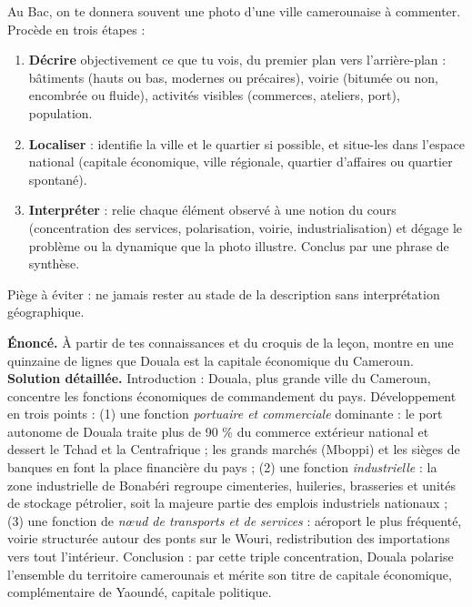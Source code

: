 \documentclass[11pt]{article}
\begin{document}
\begin{methode}
Au Bac, on te donnera souvent une photo d'une ville camerounaise à commenter. Procède en trois étapes :
\begin{enumerate}
\item \textbf{Décrire} objectivement ce que tu vois, du premier plan vers l'arrière-plan : bâtiments (hauts ou bas, modernes ou précaires), voirie (bitumée ou non, encombrée ou fluide), activités visibles (commerces, ateliers, port), population.
\item \textbf{Localiser} : identifie la ville et le quartier si possible, et situe-les dans l'espace national (capitale économique, ville régionale, quartier d'affaires ou quartier spontané).
\item \textbf{Interpréter} : relie chaque élément observé à une notion du cours (concentration des services, polarisation, voirie, industrialisation) et dégage le problème ou la dynamique que la photo illustre. Conclus par une phrase de synthèse.
\end{enumerate}
Piège à éviter : ne jamais rester au stade de la description sans interprétation géographique.
\end{methode}

\begin{exoresolu}
\textbf{Énoncé.} À partir de tes connaissances et du croquis de la leçon, montre en une quinzaine de lignes que Douala est la capitale économique du Cameroun.
\tcblower
\textbf{Solution détaillée.} Introduction : Douala, plus grande ville du Cameroun, concentre les fonctions économiques de commandement du pays. Développement en trois points : (1) une fonction \emph{portuaire et commerciale} dominante : le port autonome de Douala traite plus de 90 \% du commerce extérieur national et dessert le Tchad et la Centrafrique ; les grands marchés (Mboppi) et les sièges de banques en font la place financière du pays ; (2) une fonction \emph{industrielle} : la zone industrielle de Bonabéri regroupe cimenteries, huileries, brasseries et unités de stockage pétrolier, soit la majeure partie des emplois industriels nationaux ; (3) une fonction de \emph{nœud de transports et de services} : aéroport le plus fréquenté, voirie structurée autour des ponts sur le Wouri, redistribution des importations vers tout l'intérieur. Conclusion : par cette triple concentration, Douala polarise l'ensemble du territoire camerounais et mérite son titre de capitale économique, complémentaire de Yaoundé, capitale politique.
\end{exoresolu}
\end{document}
